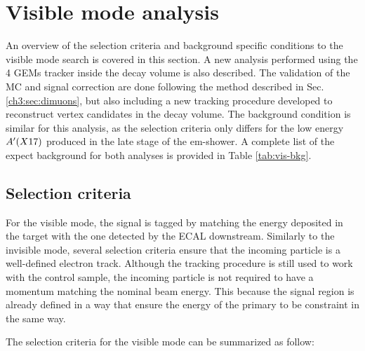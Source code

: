 \FloatBarrier\noindent
\section{Visible mode analysis}
\label{ch3:sec:analysis-vis}

An overview of the selection criteria and background specific conditions to the visible mode search is covered in this section. A new analysis performed using the 4 GEMs tracker inside the decay volume is also described. The validation of the MC and signal correction are done following the method described in Sec.\ref{ch3:sec:dimuons}, but also including a new tracking procedure developed to reconstruct vertex candidates in the decay volume. The background condition is similar for this analysis, as the selection criteria only differs for the low energy $A'(X17)$ produced in the late stage of the em-shower. A complete list of the expect background for both analyses is provided in Table \ref{tab:vis-bkg}.

\subsection{Selection criteria}
\label{ch3:sec:selection-criteria-vis}

For the visible mode, the signal is tagged by matching the energy deposited in the target with the one detected by the ECAL downstream. Similarly to the invisible mode, several selection criteria ensure that the incoming particle is a well-defined electron track. Although the tracking procedure is still used to work with the control sample, the incoming particle is not required to have a momentum matching the nominal beam energy. This because the signal region is already defined in a way that ensure the energy of the primary to be constraint in the same way.

The selection criteria for the visible mode can be summarized as follow:

